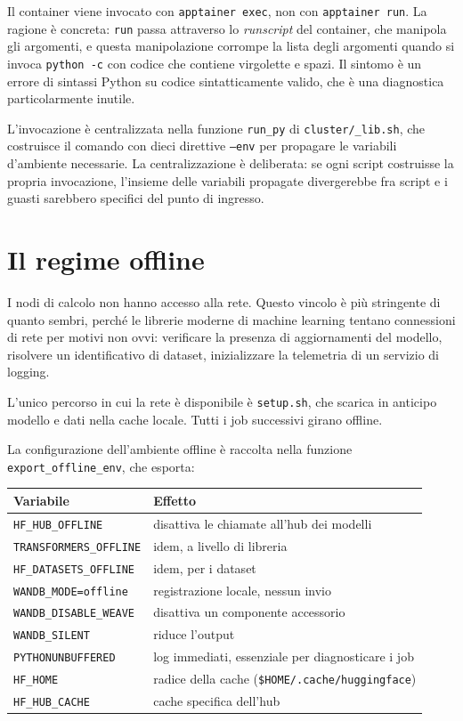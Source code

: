 Il container viene invocato con \texttt{apptainer exec}, non con
\texttt{apptainer run}. La ragione è concreta: \texttt{run} passa attraverso lo
\emph{runscript} del container, che manipola gli argomenti, e questa
manipolazione corrompe la lista degli argomenti quando si invoca
\texttt{python -c} con codice che contiene virgolette e spazi. Il sintomo è un
errore di sintassi Python su codice sintatticamente valido, che è una
diagnostica particolarmente inutile.

L'invocazione è centralizzata nella funzione \texttt{run\_py} di
\texttt{cluster/\_lib.sh}, che costruisce il comando con dieci direttive
\texttt{--env} per propagare le variabili d'ambiente necessarie. La
centralizzazione è deliberata: se ogni script costruisse la propria
invocazione, l'insieme delle variabili propagate divergerebbe fra script e i
guasti sarebbero specifici del punto di ingresso.

\section{Il regime offline}

I nodi di calcolo non hanno accesso alla rete. Questo vincolo è più stringente
di quanto sembri, perché le librerie moderne di machine learning tentano
connessioni di rete per motivi non ovvi: verificare la presenza di aggiornamenti
del modello, risolvere un identificativo di dataset, inizializzare la
telemetria di un servizio di logging.

L'unico percorso in cui la rete è disponibile è \texttt{setup.sh}, che scarica
in anticipo modello e dati nella cache locale. Tutti i job successivi girano
offline.

La configurazione dell'ambiente offline è raccolta nella funzione
\texttt{export\_offline\_env}, che esporta:

\begin{center}
\begin{tabular}{ll}
\toprule
Variabile & Effetto \\
\midrule
\texttt{HF\_HUB\_OFFLINE} & disattiva le chiamate all'hub dei modelli \\
\texttt{TRANSFORMERS\_OFFLINE} & idem, a livello di libreria \\
\texttt{HF\_DATASETS\_OFFLINE} & idem, per i dataset \\
\texttt{WANDB\_MODE=offline} & registrazione locale, nessun invio \\
\texttt{WANDB\_DISABLE\_WEAVE} & disattiva un componente accessorio \\
\texttt{WANDB\_SILENT} & riduce l'output \\
\texttt{PYTHONUNBUFFERED} & log immediati, essenziale per diagnosticare i job \\
\texttt{HF\_HOME} & radice della cache (\texttt{\$HOME/.cache/huggingface}) \\
\texttt{HF\_HUB\_CACHE} & cache specifica dell'hub \\
\bottomrule
\end{tabular}
\end{center}

